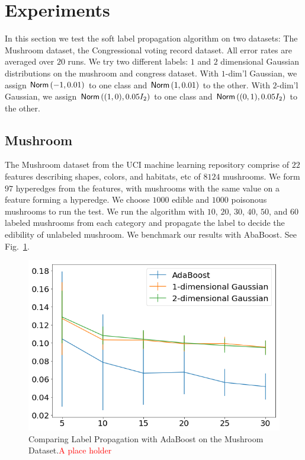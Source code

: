 \documentclass[letterpaper]{article} %
\begin{document}
\section{Experiments}
In this section we test the soft label propagation algorithm on two datasets: The Mushroom dataset, the Congressional voting record dataset.%
All error rates are averaged over $20$ runs. We try two different labels: $1$ and $2$ dimensional Gaussian distributions on the mushroom and congress dataset. With $1$-dim'l Gaussian, we assign $\mathsf{Norm}\left(-1, 0.01\right)$ to one class and $\mathsf{Norm}\left(1, 0.01\right)$ to the other. With $2$-dim'l Gaussian, we assign $\mathsf{Norm}\left((1, 0), 0.05I_2\right)$ to one class and $\mathsf{Norm}\left((0, 1), 0.05I_2\right)$ to the other. 

\subsection{Mushroom}
The Mushroom dataset from the UCI machine learning repository comprise of $22$ features describing shapes, colors, and habitats, etc of $8124$ mushrooms. We form $97$ hyperedges from the features, with mushrooms with the same value on a feature forming a hyperedge. We choose $1000$ edible and $1000$ poisonous mushrooms to run the test. We run the algorithm with $10$, $20$, $30$, $40$, $50$, and $60$ labeled mushrooms from each category and propagate the label to decide the edibility of unlabeled mushroom. We benchmark our results with AbaBoost. See Fig.~\ref{fig:lp_vs_AdaBoost_mushroom}.
\begin{figure}
    \centering
    \includegraphics[scale=.3]{Figures/Congress_labelProp_vs_AdaBoost.png}
    \caption{Comparing Label Propagation with AdaBoost on the Mushroom Dataset.\textcolor{red}{A place holder}}
    \label{fig:lp_vs_AdaBoost_mushroom}
\end{figure}
\end{document}
